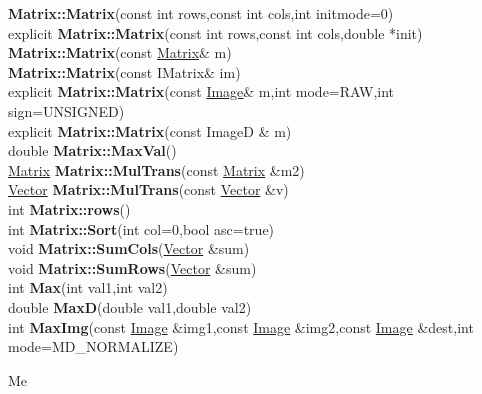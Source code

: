 \documentclass[10pt,titlepage]{article}
\def\functionlistentry#1#2#3#4#5#6{\noindent #1 {\bf #2}(#3) \dotfill #6\\}
\def\letterref#1{}
\def\letterlabel#1{\vspace{0.5cm}\centerline{\Large #1}}
\begin{document}
{{\functionlistentry{}{Matrix::Matrix}{const int rows,const int cols,int initmode=0}{256}{datastructures}{}
\functionlistentry{explicit}{Matrix::Matrix}{const int rows,const int cols,double *init}{257}{datastructures}{}
\functionlistentry{}{Matrix::Matrix}{const \hyperlink{Matrix}{Matrix}\& m}{258}{datastructures}{}
\functionlistentry{}{Matrix::Matrix}{const IMatrix\& im}{259}{datastructures}{}
\functionlistentry{explicit}{Matrix::Matrix}{const \hyperlink{Image}{Image}\& m,int mode=RAW,int sign=UNSIGNED}{260}{datastructures}{}
\functionlistentry{explicit}{Matrix::Matrix}{const ImageD \& m}{261}{datastructures}{}
\functionlistentry{double}{Matrix::MaxVal}{}{273}{datastructures}{}
\functionlistentry{\hyperlink{Matrix}{Matrix}}{Matrix::MulTrans}{const \hyperlink{Matrix}{Matrix} \&m2}{262}{datastructures}{}
\functionlistentry{\hyperlink{Vector}{Vector}}{Matrix::MulTrans}{const \hyperlink{Vector}{Vector} \&v}{263}{datastructures}{}
\functionlistentry{int}{Matrix::rows}{}{264}{datastructures}{}
\functionlistentry{int}{Matrix::Sort}{int col=0,bool asc=true}{278}{datastructures}{}
\functionlistentry{void}{Matrix::SumCols}{\hyperlink{Vector}{Vector} \&sum}{275}{datastructures}{}
\functionlistentry{void}{Matrix::SumRows}{\hyperlink{Vector}{Vector} \&sum}{274}{datastructures}{}
\functionlistentry{int}{Max}{int val1,int val2}{1352}{numeric}{}
\functionlistentry{double}{MaxD}{double val1,double val2}{1354}{numeric}{}
\functionlistentry{int}{MaxImg}{const \hyperlink{Image}{Image} \&img1,const \hyperlink{Image}{Image} \&img2,const \hyperlink{Image}{Image} \&dest,int mode=MD\_NORMALIZE}{1090}{processing}{}

\letterlabel{Me}
\letterref{A}
\letterref{B}
\letterref{C}
\letterref{D}
\letterref{E}
\letterref{F}
\letterref{G}
\letterref{H}
\letterref{I}
\letterref{K}
\letterref{L}
\letterref{M}
\letterref{N}
\letterref{O}
\letterref{P}
\letterref{Q}
\letterref{R}
\letterref{S}
\letterref{T}
\letterref{U}
\letterref{V}
\letterref{W}
\letterref{X}
\letterref{Y}
\letterref{Z}

}}
\end{document}
